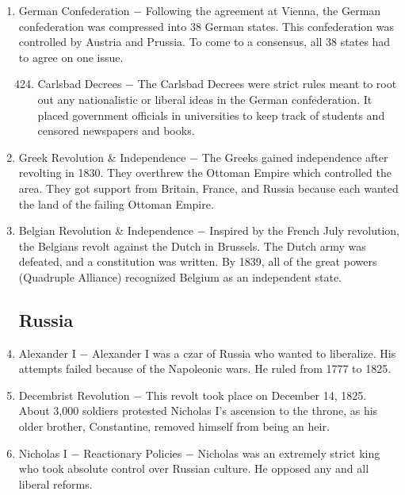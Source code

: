 \documentclass[12pt]{article}
\begin{document}
\begin{enumerate}
\begin{tabular}{p{} p{} p{} p{}}
\end{tabular}

\item German Confederation $-$ Following the agreement at Vienna, the German confederation was compressed into 38 German states. This confederation was controlled by Austria and Prussia. To come to a consensus, all 38 states had to agree on one issue.

\begin{enumerate}[label=\arabic{*}.]
\setcounter{enumii}{423}

\item Carlsbad Decrees $-$ The Carlsbad Decrees were strict rules meant to root out any nationalistic or liberal ideas in the German confederation. It placed government officials in universities to keep track of students and censored newspapers and books.

\end{enumerate}
\setcounter{enumi}{424}

\item Greek Revolution \& Independence $-$ The Greeks gained independence after revolting in 1830. They overthrew the Ottoman Empire which controlled the area. They got support from Britain, France, and Russia because each wanted the land of the failing Ottoman Empire.

\item Belgian Revolution \& Independence $-$ Inspired by the French July revolution, the Belgians revolt against the Dutch in Brussels. The Dutch army was defeated, and a constitution was written. By 1839, all of the great powers (Quadruple Alliance) recognized Belgium as an independent state.

\subsection{Russia}

\item Alexander I $-$ Alexander I was a czar of Russia who wanted to liberalize. His attempts failed because of the Napoleonic wars. He ruled from 1777 to 1825.

\item Decembrist Revolution $-$ This revolt took place on December 14, 1825. About 3,000 soldiers protested Nicholas I's ascension to the throne, as his older brother, Constantine, removed himself from being an heir.

\item Nicholas I $-$ Reactionary Policies $-$ Nicholas was an extremely strict king who took absolute control over Russian culture. He opposed any and all liberal reforms.


\end{enumerate}
\end{document}

